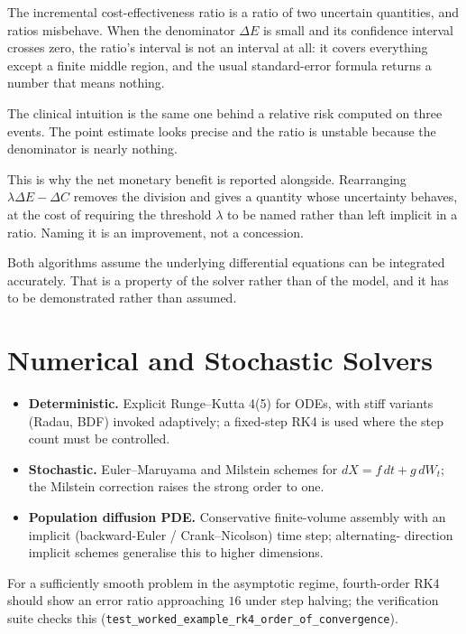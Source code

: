 \begin{reading}
The incremental cost-effectiveness ratio is a ratio of two uncertain
quantities, and ratios misbehave. When the denominator $\Delta E$ is small and
its confidence interval crosses zero, the ratio's interval is not an interval
at all: it covers everything except a finite middle region, and the usual
standard-error formula returns a number that means nothing.

The clinical intuition is the same one behind a relative risk computed on three
events. The point estimate looks precise and the ratio is unstable because the
denominator is nearly nothing.

This is why the net monetary benefit is reported alongside. Rearranging
$\lambda\Delta E-\Delta C$ removes the division and gives a quantity whose
uncertainty behaves, at the cost of requiring the threshold $\lambda$ to be
named rather than left implicit in a ratio. Naming it is an improvement, not a
concession.
\end{reading}

Both algorithms assume the underlying differential equations can be integrated
accurately. That is a property of the solver rather than of the model, and it
has to be demonstrated rather than assumed.

\section{Numerical and Stochastic Solvers}
\label{sec:D_solvers}
\begin{itemize}
  \item \textbf{Deterministic.} Explicit Runge--Kutta 4(5) \citep{butcher_2008} for ODEs, with stiff
  variants (Radau, BDF) invoked adaptively; a fixed-step RK4 is used where the
  step count must be controlled.
  \item \textbf{Stochastic.} Euler--Maruyama and Milstein schemes \citep{kloeden_platen_1992} for
  $dX=f\,dt+g\,dW_t$; the Milstein correction raises the strong order to one.
  \item \textbf{Population diffusion PDE.} Conservative finite-volume assembly
  with an implicit (backward-Euler / Crank--Nicolson) time step; alternating-
  direction implicit schemes generalise this to higher dimensions.
\end{itemize}
For a sufficiently smooth problem in the asymptotic regime, fourth-order RK4
should show an error ratio approaching $16$ under step halving; the
verification suite checks this
(\texttt{test\_worked\_example\_rk4\_order\_of\_convergence}).


